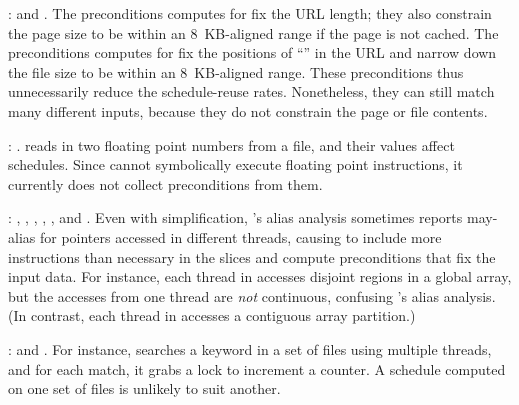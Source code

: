 : \apache and \aget. The
  preconditions \peregrine computes for \apache fix the URL length; they also
  constrain the page size to be within an 8~KB-aligned range if
    the page is not cached.  The preconditions \peregrine computes for \aget fix
    the positions of ``\vv{/}'' in the URL and narrow down the file size
    to be within an 8~KB-aligned range.  These preconditions thus
      unnecessarily reduce the schedule-reuse rates.  Nonetheless, they
      can still match many different inputs, because they do not constrain
      the page or file contents.

: \barnes.  \barnes
  reads in two floating point numbers from a file, and their values affect
  schedules.  Since \peregrine cannot symbolically execute floating point
  instructions, it currently does not collect preconditions from them.

: \lun, \radix, \waters, \watern, \ocean,
  and \cholesky.  Even with simplification, \peregrine's alias analysis
  sometimes reports may-alias for pointers accessed in different threads,
  causing \peregrine to include more instructions than necessary in the
  slices and compute preconditions that fix the input data.  For
  instance, each thread in \lun accesses disjoint regions in a global
  array, but the accesses from one thread are \emph{not} continuous,
  confusing \peregrine's alias analysis.  (In contrast, each thread in \luc accesses
  a contiguous array partition.)

: \pfscan and
  \fmm.  For instance, \pfscan searches a keyword in a set of files using
  multiple threads, and for each match, it grabs a lock to increment a
  counter.  A schedule computed on one set of files is unlikely to suit
  another.


